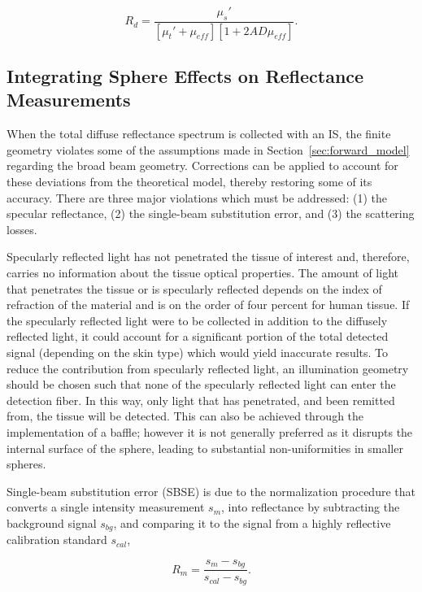 \begin{equation}
\label{eq:diff_refl}
	R_d = \frac{\mu_s'}{\left[\mu_t' + \mu_{eff}\right]\left[1 + 2AD\mu_{eff}\right]}.
\end{equation}

\subsection{Integrating Sphere Effects on Reflectance Measurements}
When the total diffuse reflectance spectrum is collected with an IS, the finite geometry violates some of the assumptions made in Section~\ref{sec:forward_model} regarding the broad beam geometry. Corrections can be applied to account for these deviations from the theoretical model, thereby restoring some of its accuracy. There are three major violations which must be addressed: (1) the specular reflectance, (2) the single-beam substitution error, and (3) the scattering losses.

Specularly reflected light has not penetrated the tissue of interest and, therefore, carries no information about the tissue optical properties. The amount of light that penetrates the tissue or is specularly reflected depends on the index of refraction of the material and is on the order of four percent for human tissue.\cite{Welch2011} If the specularly reflected light were to be collected in addition to the diffusely reflected light, it could account for a significant portion of the total detected signal (depending on the skin type) which would yield inaccurate results. To reduce the contribution from specularly reflected light, an illumination geometry should be chosen such that none of the specularly reflected light can enter the detection fiber. In this way, only light that has penetrated, and been remitted from, the tissue will be detected. This can also be achieved through the implementation of a baffle; however it is not generally preferred as it disrupts the internal surface of the sphere, leading to substantial non-uniformities in smaller spheres.\cite{Labspherea}

Single-beam substitution error (SBSE) is due to the normalization procedure that converts a single intensity measurement $s_m$, into reflectance by subtracting the background signal $s_{bg}$, and comparing it to the signal from a highly reflective calibration standard $s_{cal}$,\cite{Springsteen1998}

\begin{equation}
	R_m = \frac{s_m - s_{bg}}{s_{cal} - s_{bg}}.
\end{equation}


